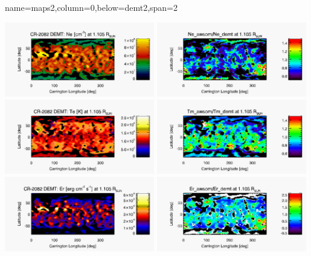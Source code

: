 \documentclass[paperwidth=100cm,paperheight=120cm]{baposter}
\def\azul#1{\textcolor{blue}{#1}}
\begin{document}
\begin{poster}
{{}
}

{name=maps2,column=0,below=demt2,span=2}{
\begin{center}
{\includegraphics[width=0.49\textwidth]{map_Ne_CR2082_DEMT-EUVI_behind_H1-L3523_r3d_1105_Rsun.pdf}}
{\includegraphics[width=0.49\textwidth]{map_ratio_Ne_awsom_2082_185_short-Ne_CR2082_DEMT-EUVI_behind_H1-L3523_r3d_1105_Rsun.pdf}}
{\includegraphics[width=0.49\textwidth]{map_Tm_CR2082_DEMT-EUVI_behind_H1-L3523_r3d_1105_Rsun.pdf}}
{\includegraphics[width=0.49\textwidth]{map_ratio_Te_awsom_2082_185_short-Tm_CR2082_DEMT-EUVI_behind_H1-L3523_r3d_1105_Rsun.pdf}}
{\includegraphics[width=0.49\textwidth]{map_Er_CR2082_DEMT-EUVI_behind_H1-L3523_r3d_1105_Rsun.pdf}}
{\includegraphics[width=0.49\textwidth]{map_ratio_qrad_awsom_2082_185_short-Er_CR2082_DEMT-EUVI_behind_H1-L3523_r3d_1105_Rsun.pdf}}\\


\end{center}}
\end{poster}
\end{document}
